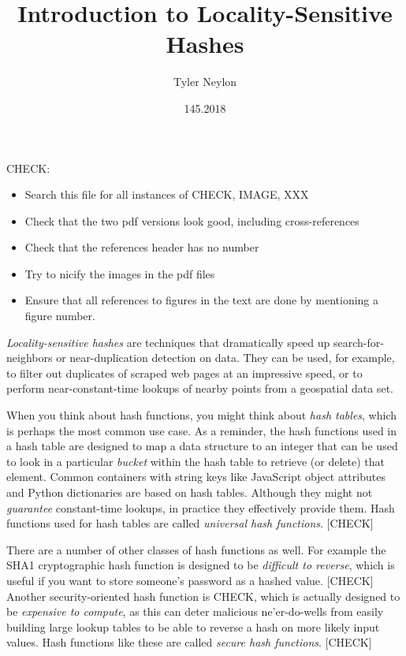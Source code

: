 \documentclass[20pt,]{extarticle}
\title{Introduction to Locality-Sensitive Hashes}
\author{Tyler Neylon}
\date{145.2018}
\providecommand{\tightlist}{%
  \setlength{\itemsep}{0pt}\setlength{\parskip}{0pt}}
\newcommand{\class}[1]{}
\newcommand{\optquad}{\quad}
\newcommand{\smallscrneg}{}
\newcommand{\smallscr}[1]{}
\newcommand{\bigscr}[1]{#1}
\newcommand{\smallscrskip}[1]{}
\begin{document}
\maketitle

CHECK:

\begin{itemize}
\tightlist
\item
  Search this file for all instances of CHECK, IMAGE, XXX
\item
  Check that the two pdf versions look good, including cross-references
\item
  Check that the references header has no number
\item
  Try to nicify the images in the pdf files
\item
  Ensure that all references to figures in the text are done by
  mentioning a figure number.
\end{itemize}

\newcommand{\R}{\mathbb{R}}
\newcommand{\Z}{\mathbb{Z}}
\newcommand{\eqnset}[1]{\left.\mbox{$#1$}\;\;\right\rbrace\class{postbrace}{ }}
\providecommand{\optquad}{\class{optquad}{}}
\providecommand{\smallscrneg}{\class{smallscrneg}{ }}
\providecommand{\bigscr}[1]{\class{bigscr}{#1}}
\providecommand{\smallscr}[1]{\class{smallscr}{#1}}
\providecommand{\smallscrskip}[1]{\class{smallscrskip}{\hskip #1}}

\emph{Locality-sensitive hashes} are techniques that dramatically speed
up search-for-neighbors or near-duplication detection on data. They can
be used, for example, to filter out duplicates of scraped web pages at
an impressive speed, or to perform near-constant-time lookups of nearby
points from a geospatial data set.

When you think about hash functions, you might think about \emph{hash
tables}, which is perhaps the most common use case. As a reminder, the
hash functions used in a hash table are designed to map a data structure
to an integer that can be used to look in a particular \emph{bucket}
within the hash table to retrieve (or delete) that element. Common
containers with string keys like JavaScript object attributes and Python
dictionaries are based on hash tables. Although they might not
\emph{guarantee} constant-time lookups, in practice they effectively
provide them. Hash functions used for hash tables are called
\emph{universal hash functions}. {[}CHECK{]}

There are a number of other classes of hash functions as well. For
example the SHA1 cryptographic hash function is designed to be
\emph{difficult to reverse}, which is useful if you want to store
someone's password as a hashed value. {[}CHECK{]} Another
security-oriented hash function is CHECK, which is actually designed to
be \emph{expensive to compute}, as this can deter malicious
ne'er-do-wells from easily building large lookup tables to be able to
reverse a hash on more likely input values. Hash functions like these
are called \emph{secure hash functions}. {[}CHECK{]}
\end{document}

